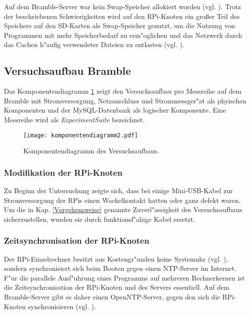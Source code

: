 Auf dem Bramble-Server war kein Swap-Speicher allokiert worden (vgl. \cite{kli13}). Trotz der beschriebenen Schwierigkeiten wird auf den RPi-Knoten ein gro\ss er Teil des Speichers auf den SD-Karten als Swap-Speicher genutzt, um die Nutzung von Programmen mit mehr Speicherbedarf zu erm"oglichen und das Netzwerk durch das Cachen h"aufig verwendeter Dateien zu entlasten (vgl. \cite{kli13}).  

\subsection{Versuchsaufbau Bramble}\label{Bramble-Versuchsaufbau}

Das Komponentendiagramm \ref{fig:Komponentendiagramm} zeigt den Versuchsaufbau pro Messreihe auf dem Bramble mit Stromversorgung, Netzanschluss und Strommessger"at als phyischen Komponenten und der MySQL-Datenbank als logischer Komponente. Eine Messreihe wird als \textit{ExperimentSuite} bezeichnet. 
\begin{figure}[htb]
  \centering
  \centerline{\texttt{[image: komponentendiagramm2.pdf]}} 
  \caption{Komponentendiagramm des Versuchsaufbaus.}
  \label{fig:Komponentendiagramm}		
\end{figure}
\subsubsection{Modifikation der RPi-Knoten}

Zu Beginn der Untersuchung zeigte sich, dass bei einige Mini-USB-Kabel zur Stromversorgung der RPis einen Wackelkontakt hatten oder ganz defekt waren. Um die in Kap. \ref{Vorgehensweise} genannte Zuverl"assigkeit des Versuchsaufbaus sicherzustellen, wurden sie durch funktionsf"ahige Kabel ersetzt. 

\subsubsection{Zeitsynchronisation der RPi-Knoten} 

Der RPi-Einzelrechner besitzt aus Kostengr"unden keine Systemuhr (vgl. \cite{schmi13}), sondern synchronisiert sich beim Booten gegen einen NTP-Server im Internet. F"ur die parallele Ausf"uhrung eines Programms auf mehreren Rechnerkernen ist die Zeitsynchronisation der RPi-Knoten und des Servers essentiell. Auf dem Bramble-Server gibt es daher einen OpenNTP-Server, gegen den sich die RPi-Knoten synchronisieren (vgl. \cite{kli13}). 

